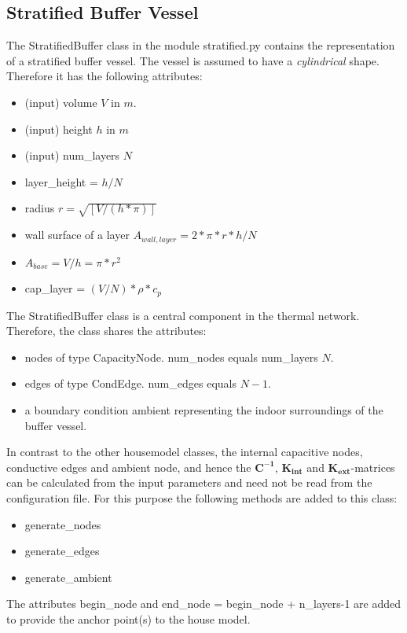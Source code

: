 % 

\subsection{Stratified Buffer Vessel}

The \textsf{StratifiedBuffer} class in the module \textsf{stratified.py} contains the representation of a stratified buffer vessel. The vessel is assumed to have a \emph{cylindrical} shape. Therefore it has the following attributes:

\begin{itemize}
	\item (input) volume $V$ in $m$.
	\item (input) height $h$ in $m$
	\item (input) num\_layers $N$
	\item {layer\_height = $h / N$}
	\item radius $r = \sqrt{[V / (h * \pi)]}$
	\item wall surface of a layer $A_{wall,layer} = 2 * \pi * r * h/N$
	\item $A_{base} = V / h = \pi * r^2$
	\item cap\_layer = $(V / N) * \rho * c_p$
\end{itemize}



The \textsf{StratifiedBuffer} class is a central component in the thermal network. Therefore, the class shares the attributes:
\begin{itemize}
	\item \textsf{nodes} of type \textsf{CapacityNode}. \textsf{num\_nodes} equals num\_layers $N$.
	\item \textsf{edges} of type \textsf{CondEdge}. \textsf{num\_edges} equals $N-1$.
	\item a boundary condition \textsf{ambient} representing the indoor surroundings of the buffer vessel.
\end{itemize}

In contrast to the other \textsf{housemodel} classes, the internal capacitive nodes, conductive edges and ambient node, and hence the $\mathbf{C^{-1}}$, $\mathbf{K_{int}}$ and $\mathbf{K_{ext}}$-matrices can be calculated from the input parameters and need not be read from the configuration file. For this purpose the following methods are added to this class:

\begin{itemize}
	\item \textsf{generate\_nodes}
	\item \textsf{generate\_edges}
	\item \textsf{generate\_ambient}
\end{itemize}

The attributes \textsf{begin\_node} and \textsf{end\_node} = \textsf{begin\_node + n\_layers-1} are added to provide the anchor point(s) to the house model.


\newpage
